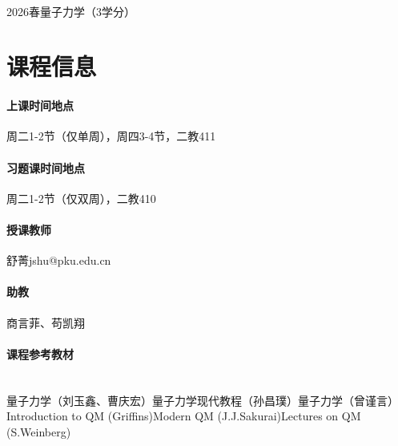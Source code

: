 \documentclass[a4paper]{ctexart}
\numberwithin{equation}{section}
\begin{document}
$\ $
\vspace{2cm}
\begin{center}
    \heiti 2026春量子力学（3学分）
\end{center}
\vspace{2cm}
\section*{课程信息}
\paragraph{上课时间地点}周二1-2节（仅单周），周四3-4节，二教411
\paragraph{习题课时间地点}周二1-2节（仅双周），二教410
\paragraph{授课教师}舒菁\quad jshu@pku.edu.cn
\paragraph{助教}商言菲、苟凯翔
\paragraph{课程参考教材}\quad \\
量子力学（刘玉鑫、曹庆宏）\qquad 量子力学现代教程（孙昌璞）\qquad 量子力学（曾谨言）\\
Introduction to QM (Griffins)\qquad Modern QM (J.J.Sakurai)\qquad Lectures on QM (S.Weinberg)
\newpage
\tableofcontents
\newpage




\end{document}
